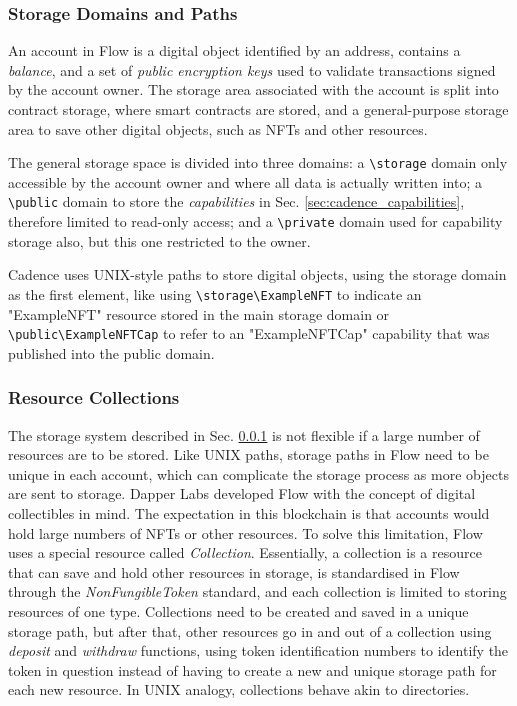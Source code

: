 \documentclass[../NFTComp_IEEE.tex]{subfiles}
\begin{document}
\subsubsection{Storage Domains and Paths}
\label{sec:cadence_storage_domain}
An account in Flow is a digital object identified by an address, contains a \textit{balance}, and a set of \textit{public encryption keys} used to validate transactions signed by the account owner. The storage area associated with the account is split into contract storage, where smart contracts are stored, and a general-purpose storage area to save other digital objects, such as NFTs and other resources.
\par
The general storage space is divided into three domains: a \verb|\storage| domain only accessible by the account owner and where all data is actually written into; a \verb|\public| domain to store the \textit{capabilities} in Sec. \ref{sec:cadence_capabilities}, therefore limited to read-only access; and a \verb|\private| domain used for capability storage also, but this one restricted to the owner.
\par
Cadence uses UNIX-style paths to store digital objects, using the storage domain as the first element, like using \verb|\storage\ExampleNFT| to indicate an "ExampleNFT" resource stored in the main storage domain or \verb|\public\ExampleNFTCap| to refer to an "ExampleNFTCap" capability that was published into the public domain.

\subsubsection{Resource Collections}
\label{sec:resource_collections}
The storage system described in Sec. \ref{sec:cadence_storage_domain} is not flexible if a large number of resources are to be stored. Like UNIX paths, storage paths in Flow need to be unique in each account, which can complicate the storage process as more objects are sent to storage. Dapper Labs developed Flow with the concept of digital collectibles in mind. The expectation in this blockchain is that accounts would hold large numbers of NFTs or other resources. To solve this limitation, Flow uses a special resource called \textit{Collection}. Essentially, a collection is a resource that can save and hold other resources in storage, is standardised in Flow through the \textit{NonFungibleToken} standard, and each collection is limited to storing resources of one type. Collections need to be created and saved in a unique storage path, but after that, other resources go in and out of a collection using \textit{deposit} and \textit{withdraw} functions, using token identification numbers to identify the token in question instead of having to create a new and unique storage path for each new resource. In UNIX analogy, collections behave akin to directories.
\end{document}
